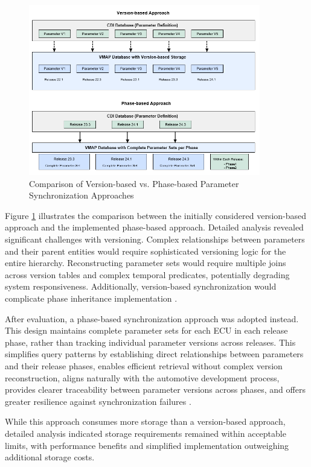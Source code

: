 \begin{figure}[htbp]
    \centering
    \includegraphics[width=0.9\textwidth]{figures/param-sync-approaches.png}
    \caption{Comparison of Version-based vs. Phase-based Parameter Synchronization Approaches}
    \label{fig:param-sync-approaches}
\end{figure}

Figure \ref{fig:param-sync-approaches} illustrates the comparison between the initially considered version-based approach and the implemented phase-based approach. Detailed analysis revealed significant challenges with versioning. Complex relationships between parameters and their parent entities would require sophisticated versioning logic for the entire hierarchy. Reconstructing parameter sets would require multiple joins across version tables and complex temporal predicates, potentially degrading system responsiveness. Additionally, version-based synchronization would complicate phase inheritance implementation \cite{kulkarni2012temporal}.

After evaluation, a phase-based synchronization approach was adopted instead. This design maintains complete parameter sets for each ECU in each release phase, rather than tracking individual parameter versions across releases. This simplifies query patterns by establishing direct relationships between parameters and their release phases, enables efficient retrieval without complex version reconstruction, aligns naturally with the automotive development process, provides clearer traceability between parameter versions across phases, and offers greater resilience against synchronization failures \cite{hohpe2002enterprise}.

While this approach consumes more storage than a version-based approach, detailed analysis indicated storage requirements remained within acceptable limits, with performance benefits and simplified implementation outweighing additional storage costs.

